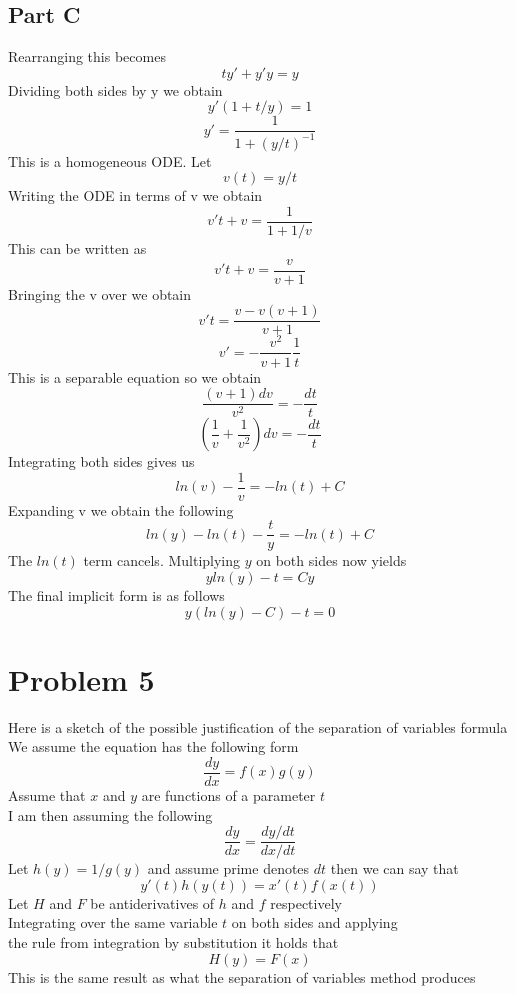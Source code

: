 \documentclass{article}
\begin{document}
\subsection{Part C}

Rearranging this becomes
\[
t y' + y' y = y
\]
Dividing both sides by y we obtain
\[
y'(1 + t/y) = 1
\]
\[
y' = \frac{1}{1+(y/t)^{-1}}
\]
This is a homogeneous ODE. Let 
\[
v(t) = y/t
\]
Writing the ODE in terms of v we obtain
\[
v' t + v = \frac{1}{1+1/v}
\]
This can be written as
\[
v' t + v = \frac{v}{v+1}
\]
Bringing the v over we obtain
\[
v' t = \frac{v - v(v+1)}{v+1}
\]
\[
v' = -\frac{v^2}{v+1} \frac{1}{t}
\]
This is a separable equation so we obtain
\[
\frac{(v+1) dv}{v^2} = - \frac{dt}{t}
\]
\[
(\frac{1}{v} + \frac{1}{v^2})dv = -\frac{dt}{t}
\]
Integrating both sides gives us
\[
ln(v) - \frac{1}{v} = - ln(t) + C
\]
Expanding v we obtain the following
\[
ln(y) - ln(t) - \frac{t}{y} = -ln(t) + C
\]
The $ln(t)$ term cancels. Multiplying $y$ on both sides now yields
\[
y ln(y) - t = Cy
\]
The final implicit form is as follows
\[
y (ln(y) - C) - t = 0
\]

\section{Problem 5}

Here is a sketch of the possible justification of the separation of variables formula\\
We assume the equation has the following form
\[
\frac{dy}{dx} = f(x)g(y)
\]
Assume that $x$ and $y$ are functions of a parameter $t$\\
I am then assuming the following
\[
\frac{dy}{dx} = \frac{dy/dt}{dx/dt}
\]
Let $h(y)=1/g(y)$ and assume prime denotes $dt$ then we can say that
\[
y'(t) h(y(t)) = x'(t) f(x(t))
\]
Let $H$ and $F$ be antiderivatives of $h$ and $f$ respectively\\
Integrating over the same variable $t$ on both sides and applying \\
the rule from integration by substitution it holds that
\[
H(y) = F(x)
\]
This is the same result as what the separation of variables method produces
\end{document}
